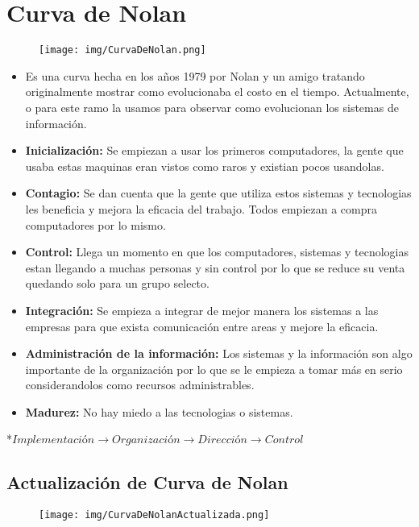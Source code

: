\documentclass{templateNote}
\begin{document}
\section{Curva de Nolan}
\begin{figure}[H]
    \centering
    \texttt{[image: img/CurvaDeNolan.png]}
\end{figure}
\begin{itemize}
    \item Es una curva hecha en los años 1979 por Nolan y un amigo tratando originalmente mostrar como evolucionaba el costo en el tiempo. Actualmente, o para este ramo la usamos para observar como evolucionan los sistemas de información.
    
    \item \textbf{Inicialización:} Se empiezan a usar los primeros computadores, la gente que usaba estas maquinas eran vistos como raros y existian pocos usandolas.
    
    \item \textbf{Contagio:} Se dan cuenta que la gente que utiliza estos sistemas y tecnologias les beneficia y mejora la eficacia del trabajo. Todos empiezan a compra computadores por lo mismo.
    
    \item \textbf{Control:} Llega un momento en que los computadores, sistemas y tecnologias estan llegando a muchas personas y sin control por lo que se reduce su venta quedando solo para un grupo selecto.
    
    \item \textbf{Integración:} Se empieza a integrar de mejor manera los sistemas a las empresas para que exista comunicación entre areas y mejore la eficacia.
    
    \item \textbf{Administración de la información:} Los sistemas y la información son algo importante de la organización por lo que se le empieza a tomar más en serio considerandolos como recursos administrables.
    
    \item \textbf{Madurez:} No hay miedo a las tecnologias o sistemas.
\end{itemize}
*$Implementación \rightarrow Organización \rightarrow Dirección \rightarrow Control$
\newpage
\begin{landscape}
    \section*{Actualización de Curva de Nolan}
    \begin{figure}[H]
        \centering
        \vspace*{\fill}
        
        \texttt{[image: img/CurvaDeNolanActualizada.png]}
        \vspace*{\fill}
    \end{figure}
\end{landscape}
\newpage

\end{document}
